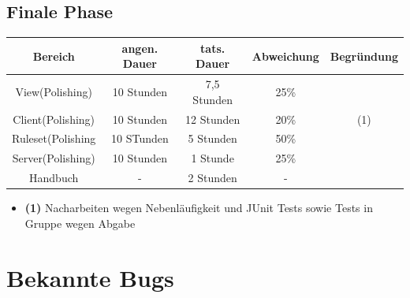 \documentclass{article}
\begin{document}
\subsection{Finale Phase}
\begin{tabular}{|c|c|c|c|c|}\hline
   Bereich & angen. Dauer & tats. Dauer & Abweichung & Begründung\\ \hline\hline
   View(Polishing) & 10 Stunden & 7,5 Stunden & 25\% &\\ \hline
   Client(Polishing) & 10 Stunden & 12 Stunden & 20\% & (1) \\ \hline
   Ruleset(Polishing & 10 STunden & 5 Stunden & 50\% &\\ \hline
   Server(Polishing) & 10 Stunden & 1 Stunde & 25\% &\\ \hline
 Handbuch & - & 2 Stunden & - &\\ \hline
 
 \end{tabular}
 
 \begin{itemize}
\item \textbf{(1)} Nacharbeiten wegen Nebenläufigkeit und JUnit Tests sowie Tests in Gruppe wegen Abgabe\\
\end{itemize}
 
 \section{Bekannte Bugs}
\end{document}
